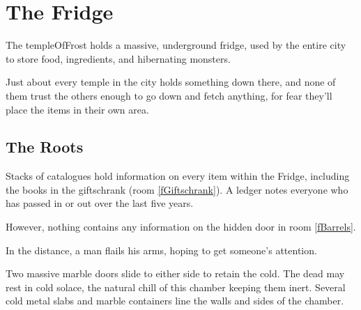 \section{The Fridge}

\begin{multicols}{2}

\noindent
The \gls{templeOfFrost} holds a massive, underground fridge, used by the entire city to store food, \glspl{ingredient}, and hibernating \glspl{monster}.

Just about every \gls{temple} in the city holds something down there, and none of them trust the others enough to go down and fetch anything, for fear they'll place the items in their own area.

\renewcommand\csComments{
  \callout{18,5}{-2,-2}{\ref{fGnomePassages}: \nameref{fGnomePassages}}{}
  \callout{7.5,0}{0,2.5}{\ref{fGuardDoor}: \nameref{fGuardDoor}}{}
  \mapFeature{15,9}{S}
}


\subsection{The Roots}






Stacks of catalogues hold information on every item within the Fridge, including the books in the giftschrank (room \vref{fGiftschrank}).
A ledger notes everyone who has passed in or out over the last five years.

However, nothing contains any information on the hidden door in room \vref{fBarrels}.


In the distance, a man flails his arms, hoping to get someone's attention.


Two massive marble doors slide to either side to retain the cold.
The dead may rest in cold solace, the natural chill of this chamber keeping them inert.
Several cold metal slabs and marble containers line the walls and sides of the chamber. 


\end{multicols}

